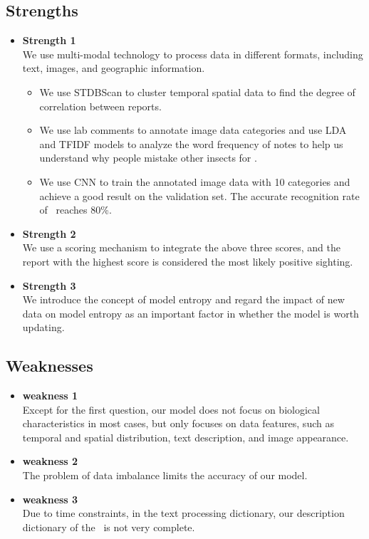 \documentclass{mcmthesis}
\begin{document}
\subsection{Strengths}
\begin{itemize}
    \item \textbf{Strength 1}\\
    We use multi-modal technology to process data in different formats, including text, images, and geographic information.
    \begin{itemize}
    \item We use STDBScan to cluster temporal spatial data to find the degree of correlation between reports.
    \item We use lab comments to annotate image data categories and use LDA and TFIDF models to analyze the word frequency of notes to help us understand why people mistake other insects for \VM.
    \item We use CNN to train the annotated image data with 10 categories and achieve a good result on the validation set. The accurate recognition rate of \VM\ reaches 80\%.
    \end{itemize}
    \item \textbf{Strength 2}\\
    We use a scoring mechanism to integrate the above three scores, and the report with the highest score is considered the most likely positive sighting.
    \item \textbf{Strength 3}\\
    We introduce the concept of model entropy and regard the impact of new data on model entropy as an important factor in whether the model is worth updating.
    
\end{itemize}

\subsection{Weaknesses}
\begin{itemize}
    \item \textbf{weakness 1}\\
    Except for the first question, our model does not focus on biological characteristics in most cases, but only focuses on data features, such as temporal and spatial distribution, text description, and image appearance.
    \item \textbf{weakness 2}\\
    The problem of data imbalance limits the accuracy of our model.
    \item \textbf{weakness 3}\\
    Due to time constraints, in the text processing dictionary, our description dictionary of the \VM\ is not very complete.
\end{itemize}
\end{document}
